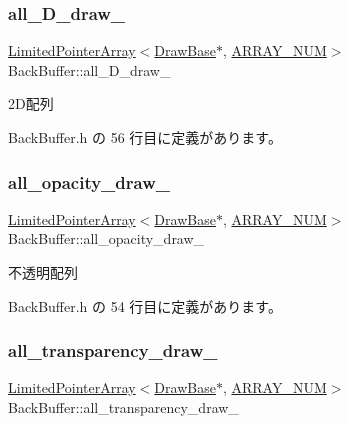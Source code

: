 \subsubsection{\texorpdfstring{all\+\_\+D\+\_\+draw\+\_\+}{all\_2D\_draw\_}}
{\footnotesize\ttfamily \mbox{\hyperlink{class_limited_pointer_array}{Limited\+Pointer\+Array}}$<$\mbox{\hyperlink{class_draw_base}{Draw\+Base}}$\ast$, \mbox{\hyperlink{class_back_buffer_a28e89a0c543b6ae579c8ab75f9917059}{A\+R\+R\+A\+Y\+\_\+\+N\+UM}}$>$ Back\+Buffer\+::all\+\_\+D\+\_\+draw\+\_\+\hspace{0.3cm}{\ttfamily [private]}}



2\+D配列 



 Back\+Buffer.\+h の 56 行目に定義があります。

\mbox{\label{class_back_buffer_a65bf72418a1ca652ef535a172bc3d7b8}} 
\subsubsection{\texorpdfstring{all\+\_\+opacity\+\_\+draw\+\_\+}{all\_opacity\_draw\_}}
{\footnotesize\ttfamily \mbox{\hyperlink{class_limited_pointer_array}{Limited\+Pointer\+Array}}$<$\mbox{\hyperlink{class_draw_base}{Draw\+Base}}$\ast$, \mbox{\hyperlink{class_back_buffer_a28e89a0c543b6ae579c8ab75f9917059}{A\+R\+R\+A\+Y\+\_\+\+N\+UM}}$>$ Back\+Buffer\+::all\+\_\+opacity\+\_\+draw\+\_\+\hspace{0.3cm}{\ttfamily [private]}}



不透明配列 



 Back\+Buffer.\+h の 54 行目に定義があります。

\mbox{\label{class_back_buffer_a4148d27e959958813e88cc71ebec1a6e}} 
\subsubsection{\texorpdfstring{all\+\_\+transparency\+\_\+draw\+\_\+}{all\_transparency\_draw\_}}
{\footnotesize\ttfamily \mbox{\hyperlink{class_limited_pointer_array}{Limited\+Pointer\+Array}}$<$\mbox{\hyperlink{class_draw_base}{Draw\+Base}}$\ast$, \mbox{\hyperlink{class_back_buffer_a28e89a0c543b6ae579c8ab75f9917059}{A\+R\+R\+A\+Y\+\_\+\+N\+UM}}$>$ Back\+Buffer\+::all\+\_\+transparency\+\_\+draw\+\_\+\hspace{0.3cm}{\ttfamily [private]}}



